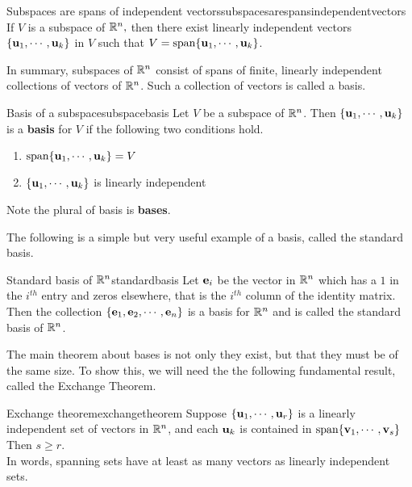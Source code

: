 \begin{corollary}{Subspaces are spans of independent vectors}{subspacesarespansindependentvectors}
If $V$ is a subspace of $\mathbb{R}^{n},$ then there exist linearly independent 
vectors $\{{\bf u}_{1},\cdots ,{\bf u}_{k}\}$ in $V$ such
that $V=\mbox{span}\{{\bf u}_{1},\cdots ,{\bf u}_{k}\} $.
\end{corollary}

In summary, subspaces of $\mathbb{R}^{n}$ consist of spans of finite,
linearly independent collections of vectors of $\mathbb{R}^{n}$.  Such
a collection of vectors is called a basis.

\begin{definition}{Basis of a subspace}{subspacebasis}
Let $V$ be a subspace of $\mathbb{R}^{n}$. Then $\{
{\bf u}_{1},\cdots ,{\bf u}_{k}\} $ is a \textbf{basis} for $V$ if the following two conditions hold.

\begin{enumerate}
\item $\mbox{span}\{{\bf u}_{1},\cdots ,{\bf u}_{k}\} =V$
\item $\{{\bf u}_{1},\cdots ,{\bf u}_{k}\} $ is linearly
independent
\end{enumerate}

Note the plural of basis is \textbf{bases}. 
\end{definition}

The following is a simple but very useful example of a basis, called the standard basis.

\begin{definition}{Standard basis of $\mathbb{R}^n$}{standardbasis}
Let ${\bf e}_i$ be the vector in $\mathbb{R}^n$ which has a $1$ in the $i^{th}$ entry and zeros elsewhere, that is the $i^{th}$ column of the identity matrix. Then the collection $\{{\bf e}_1, {\bf e}_2, \cdots, {\bf e}_n
\}$ is a basis for
$\mathbb{R}^n$ and is called the standard basis of $\mathbb{R}^n$.
\end{definition}

The main theorem about bases is not only they exist, but that they
must be of the same size. To show this, we will need the the following
fundamental result, called the Exchange Theorem.

\begin{theorem}{Exchange theorem}{exchangetheorem}
Suppose $\{{\bf u}_{1},\cdots ,{\bf u}_{r}\} $ is a
linearly independent set of vectors in $\mathbb{R}^n$, and each
${\bf u}_{k}$ is contained in $\mbox{span}\{{\bf v}_{1},\cdots
,{\bf v}_{s}\}$ Then $s\geq r.$ \\
In words, spanning sets have at least as many vectors as linearly
independent sets.
\end{theorem}

